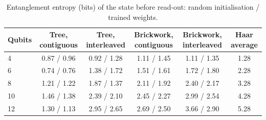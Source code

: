 \begin{table}[tbp]
\centering
\caption{Entanglement entropy (bits) of the state before read-out: random initialisation / trained weights.}
\label{tab:s_entropy}
\small
\begin{tabular}{lccccc}
\toprule
Qubits & Tree, contiguous & Tree, interleaved & Brickwork, contiguous & Brickwork, interleaved & Haar average \\
\midrule
\num{4} & \num{0.87} / \num{0.96} & \num{0.92} / \num{1.28} & \num{1.11} / \num{1.45} & \num{1.11} / \num{1.35} & \num{1.28} \\
\num{6} & \num{0.74} / \num{0.76} & \num{1.38} / \num{1.72} & \num{1.51} / \num{1.61} & \num{1.72} / \num{1.80} & \num{2.28} \\
\num{8} & \num{1.21} / \num{1.22} & \num{1.87} / \num{1.37} & \num{2.11} / \num{1.92} & \num{2.40} / \num{2.17} & \num{3.28} \\
\num{10} & \num{1.46} / \num{1.38} & \num{2.39} / \num{2.10} & \num{2.45} / \num{2.27} & \num{2.99} / \num{2.54} & \num{4.28} \\
\num{12} & \num{1.30} / \num{1.13} & \num{2.95} / \num{2.65} & \num{2.69} / \num{2.50} & \num{3.66} / \num{2.90} & \num{5.28} \\
\bottomrule
\end{tabular}
\end{table}
